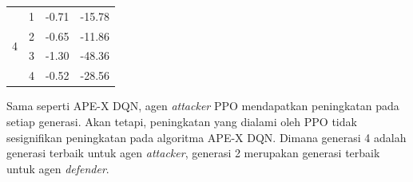 \begin{table}[H]
\begin{tabular}{|c|c|c|c|}
  \multirow{4}{*}{4}                                                           & 1                                                                            & -0.71                                                                            & -15.78                                                                           \\ \cline{2-4} 
                                                                               & 2                                                                            & -0.65                                                                            & -11.86                                                                           \\ \cline{2-4} 
                                                                               & 3                                                                            & -1.30                                                                            & -48.36                                                                           \\ \cline{2-4} 
                                                                               & 4                                                                            & -0.52                                                                            & -28.56                                                                           \\ \hline
  \end{tabular}
\end{table}

Sama seperti APE-X DQN, agen \emph{attacker} PPO mendapatkan peningkatan pada setiap generasi.
Akan tetapi, peningkatan yang dialami oleh PPO tidak sesignifikan peningkatan pada algoritma APE-X DQN.
Dimana generasi 4 adalah generasi terbaik untuk agen \emph{attacker}, generasi 2 merupakan generasi terbaik untuk agen \emph{defender}.

